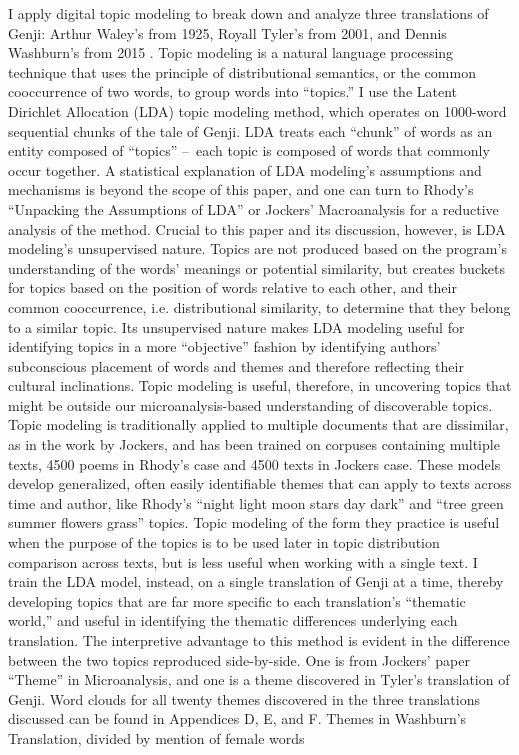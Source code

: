 \documentclass[12pt]{article}
\begin{document}
\begin{flushleft}
\begin{spacing}{2.0}
I apply digital topic modeling to break down and analyze three translations of Genji: Arthur Waley’s from 1925, Royall Tyler’s from 2001, and Dennis Washburn’s from 2015 . Topic modeling is a natural language processing technique that uses the principle of distributional semantics, or the common cooccurrence of two words, to group words into “topics.” I use the Latent Dirichlet Allocation (LDA) topic modeling method, which operates on 1000-word sequential chunks of the tale of Genji. LDA treats each “chunk” of words as an entity composed of “topics” – each topic is composed of words that commonly occur together. A statistical explanation of LDA modeling’s assumptions and mechanisms is beyond the scope of this paper, and one can turn to Rhody’s “Unpacking the Assumptions of LDA” or Jockers’ Macroanalysis for a reductive analysis of the method. Crucial to this paper and its discussion, however, is LDA modeling’s unsupervised nature. Topics are not produced based on the program’s understanding of the words’ meanings or potential similarity, but creates buckets for topics based on the position of words relative to each other, and their common cooccurrence, i.e. distributional similarity, to determine that they belong to a similar topic. Its unsupervised nature makes LDA modeling useful for identifying topics in a more “objective” fashion by identifying authors’ subconscious placement of words and themes and therefore reflecting their cultural inclinations. Topic modeling is useful, therefore, in uncovering topics that might be outside our microanalysis-based understanding of discoverable topics.  
Topic modeling is traditionally applied to multiple documents that are dissimilar, as in the work by Jockers, and has been trained on corpuses containing multiple texts, 4500 poems in Rhody’s case and 4500 texts in Jockers case. These models develop generalized, often easily identifiable themes that can apply to texts across time and author, like Rhody’s “night light moon stars day dark” and “tree green summer flowers grass” topics. Topic modeling of the form they practice is useful when the purpose of the topics is to be used later in topic distribution comparison across texts, but is less useful when working with a single text. I train the LDA model, instead, on a single translation of Genji at a time, thereby developing topics that are far more specific to each translation’s “thematic world,” and useful in identifying the thematic differences underlying each translation. The interpretive advantage to this method is evident in the difference between the two topics reproduced side-by-side. One is from Jockers’ paper “Theme” in Microanalysis, and one is a theme discovered in Tyler’s translation of Genji. Word clouds for all twenty themes discovered in the three translations discussed can be found in Appendices D, E, and F.
Themes in Washburn’s Translation, divided by mention of female words


\end{spacing}
\end{flushleft}
\end{document}
